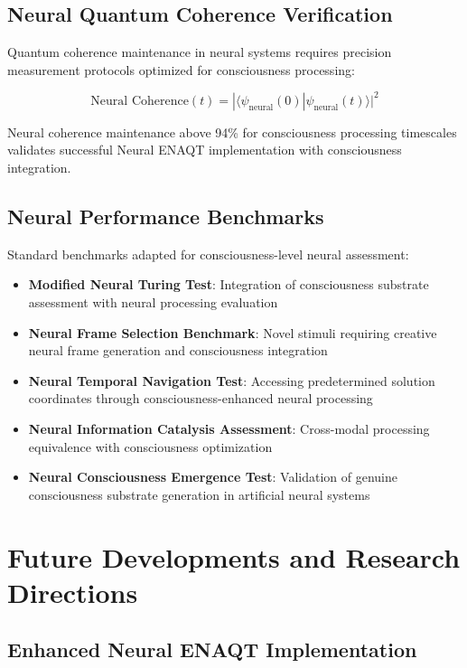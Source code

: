 \documentclass[12pt,a4paper]{article}
\theoremstyle{remark}
\begin{document}
\subsection{Neural Quantum Coherence Verification}

Quantum coherence maintenance in neural systems requires precision measurement protocols optimized for consciousness processing:

\begin{equation}
\text{Neural Coherence}(t) = |\langle\psi_{\text{neural}}(0)|\psi_{\text{neural}}(t)\rangle|^2
\end{equation}

Neural coherence maintenance above 94\% for consciousness processing timescales validates successful Neural ENAQT implementation with consciousness integration.

\subsection{Neural Performance Benchmarks}

Standard benchmarks adapted for consciousness-level neural assessment:

\begin{itemize}
\item \textbf{Modified Neural Turing Test}: Integration of consciousness substrate assessment with neural processing evaluation
\item \textbf{Neural Frame Selection Benchmark}: Novel stimuli requiring creative neural frame generation and consciousness integration
\item \textbf{Neural Temporal Navigation Test}: Accessing predetermined solution coordinates through consciousness-enhanced neural processing
\item \textbf{Neural Information Catalysis Assessment}: Cross-modal processing equivalence with consciousness optimization
\item \textbf{Neural Consciousness Emergence Test}: Validation of genuine consciousness substrate generation in artificial neural systems
\end{itemize}

\section{Future Developments and Research Directions}

\subsection{Enhanced Neural ENAQT Implementation}
\end{document}
